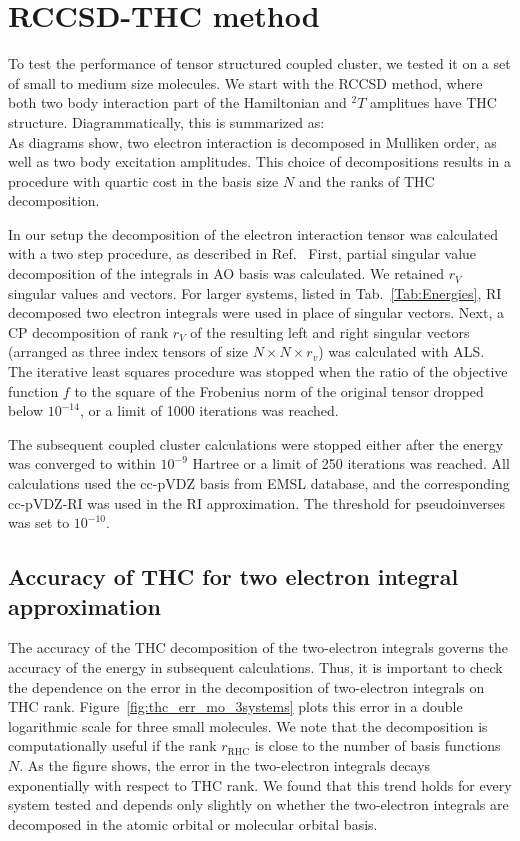 \section{RCCSD-THC method}
To test the performance of tensor structured coupled cluster, we 
tested it on a set of small to medium size molecules. We 
start with the RCCSD method, where both two body interaction part of the 
Hamiltonian and ${}^2T$ amplitues have THC structure. Diagrammatically, this is 
summarized as:
%
\begin{equation}
\label{fig:rccsd_thc_def}
\end{equation}
%
As diagrams show, two electron interaction is decomposed in Mulliken order, as 
well as two body excitation amplitudes. This choice of decompositions results 
in a procedure with quartic cost in the basis size $N$ and the ranks of THC 
decomposition.

In our setup the decomposition of the electron interaction tensor was 
calculated with a two step procedure, as described in 
Ref.~\cite{schutski2017tensor} First, partial singular value decomposition of 
the integrals in AO basis was calculated. We retained $r_{V}$ singular values 
and vectors. For larger systems, listed in Tab.~\ref{Tab:Energies}, RI 
decomposed two electron integrals were used in place of singular 
vectors. Next, a CP decomposition of rank $r_{V}$ of the resulting 
left and right singular vectors (arranged as three index tensors of size $N 
\times N \times r_{v}$) was calculated with ALS. The iterative least squares 
procedure was stopped when the ratio of the objective function $f$ to the square 
of the Frobenius norm of the original tensor dropped below $10^{-14}$, or a 
limit of 1000 iterations was reached.

The subsequent coupled cluster calculations were stopped either after the 
energy was converged to within $10^{-9}$ Hartree or a limit of 250 iterations 
was reached. All calculations used the cc-pVDZ basis from EMSL
database,\cite{schuchardt2007basis} and the corresponding cc-pVDZ-RI
was used in the RI approximation. The threshold for pseudoinverses was set to 
$10^{-10}$.

\subsection{Accuracy of THC for two electron integral approximation}
The accuracy of the THC decomposition of the two-electron integrals governs the
accuracy of the energy in subsequent calculations. Thus, it is important to 
check the dependence on the error in the decomposition of
two-electron integrals on THC rank. Figure~\ref{fig:thc_err_mo_3systems} plots 
this error in a double logarithmic scale for three small molecules.  We note 
that the decomposition is computationally useful if the rank $r_\mathrm{RHC}$
is close to the number of basis functions $N$.  As the figure shows,
the error in the two-electron integrals decays exponentially with
respect to THC rank.  We found that this trend holds for every system
tested and depends only slightly on whether the two-electron integrals
are decomposed in the atomic orbital or molecular orbital basis.

